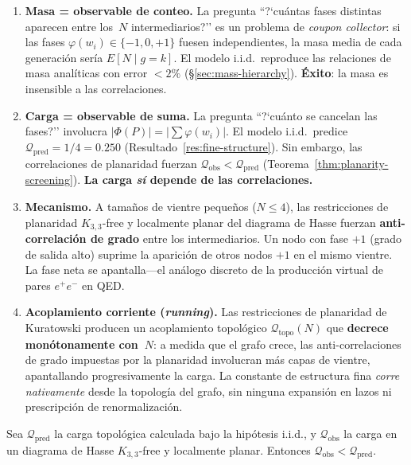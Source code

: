 \documentclass[11pt, a4paper, openany]{book}
\begin{document}
\begin{enumerate}
  \item \textbf{Masa = observable de conteo.} La pregunta ``?`cu\'antas
    fases distintas aparecen entre los~$N$ intermediarios?'' es un
    problema de \emph{coupon collector}: si las fases
    $\varphi(w_i) \in \{-1, 0, +1\}$ fuesen independientes, la masa
    media de cada generaci\'on ser\'ia $E[N \mid g = k]$. El modelo
    i.i.d.\ reproduce las relaciones de masa anal\'iticas con error
    $< 2\%$ (\S\ref{sec:mass-hierarchy}).
    \textbf{\'Exito}: la masa es insensible a las correlaciones.

  \item \textbf{Carga = observable de suma.} La pregunta ``?`cu\'anto
    se cancelan las fases?'' involucra $|\Phi(P)| = |\sum \varphi(w_i)|$.
    El modelo i.i.d.\ predice
    $\mathcal{Q}_{\mathrm{pred}} = 1/4 = 0{.}250$
    (Resultado~\ref{res:fine-structure}).
    Sin embargo, las correlaciones de planaridad fuerzan
    $\mathcal{Q}_{\mathrm{obs}} < \mathcal{Q}_{\mathrm{pred}}$
    (Teorema~\ref{thm:planarity-screening}).
    \textbf{La carga \emph{s\'i} depende de las correlaciones.}

  \item \textbf{Mecanismo.} A tama\~nos de vientre peque\~nos
    ($N \leq 4$), las restricciones de planaridad $K_{3,3}$-free y
    localmente planar del diagrama de Hasse fuerzan \textbf{anti-correlaci\'on
    de grado} entre los intermediarios. Un nodo con fase $+1$
    (grado de salida alto) suprime la aparici\'on de otros nodos $+1$ en
    el mismo vientre. La fase neta se apantalla---el an\'alogo discreto
    de la producci\'on virtual de pares $e^+e^-$ en QED.

  \item \textbf{Acoplamiento corriente (\emph{running}).}
    Las restricciones de planaridad de Kuratowski producen un
    acoplamiento topol\'ogico $\mathcal{Q}_{\mathrm{topo}}(N)$ que
    \textbf{decrece mon\'otonamente con~$N$}: a medida que el grafo
    crece, las anti-correlaciones de grado impuestas por la planaridad
    involucran m\'as capas de vientre, apantallando progresivamente
    la carga. La constante de estructura fina \emph{corre nativamente}
    desde la topolog\'ia del grafo, sin ninguna expansi\'on en lazos ni
    prescripci\'on de renormalizaci\'on.
\end{enumerate}

\begin{theorem}
\label{thm:planarity-screening}
Sea $\mathcal{Q}_{\mathrm{pred}}$ la carga topol\'ogica calculada bajo
la hip\'otesis i.i.d., y $\mathcal{Q}_{\mathrm{obs}}$ la carga en un
diagrama de Hasse $K_{3,3}$-free y localmente planar. Entonces
$\mathcal{Q}_{\mathrm{obs}} < \mathcal{Q}_{\mathrm{pred}}$.
\end{theorem}
\end{document}
